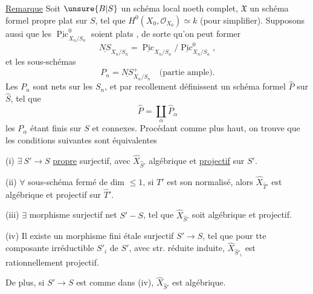 \uline{Remarque}  Soit $\unsure{B|S}$  un schéma local noeth complet, $\mathfrak X$ un schéma formel propre  plat sur $S$, tel que $H^0(X_0,\mathcal O_{X_0})\simeq k$ (pour simplifier). Supposons aussi  que  les $\underline{\operatorname{Pic}}^0_{X_n/S_n}$ soient plats  , de sorte qu'on peut former
\[
\underline{NS}_{X_n/S_n}=\underline{\operatorname{Pic}}_{X_n/S_n}/\underline{\operatorname{Pic}}^0_{X_n/S_n},
\]
et les sous-schémas
\[
P_n=\underline{NS}^{+}_{X_n/S_n}\quad\text{(partie ample).}
\]
Les $P_n$ sont nets sur les $S_n$, et par recollement définissent un schéma formel $\widehat P$ sur $\widehat S$, tel que
\[
\widehat P=\coprod_\alpha\widehat P_\alpha
\]
les $P_\alpha$ étant finis  sur $S$ et connexes. Procédant comme plus haut, on trouve que les conditions suivantes sont équivalentes

(i) $\exists\ S'\longrightarrow S$ \uline{propre} surjectif,  avec $\widehat X_{\widehat S'}$ algébrique et \uline{projectif} sur $S'$.

(ii) $\forall$ sous-schéma fermé  de dim $\leq1$, si $T'$ est son normalisé, alors $\widehat X_{\widehat T'}$ est algébrique et projectif sur $\widehat T'$.

(iii) $\exists$ morphisme  surjectif net $S'\mathbin{-}S$, tel que $\widehat X_{\widehat S'}$ soit algébrique et projectif.


(iv) Il existe un morphisme fini étale surjectif $S'\longrightarrow S$, tel que pour tte composante irréductible $S'_i$ de $S'$, avec str. réduite induite, $\widehat X_{\widehat S'_i}$ est rationnellement projectif.

De plus, si $S'\longrightarrow S$ est comme dans (iv), $\widehat X_{\widehat S'}$ est algébrique.



